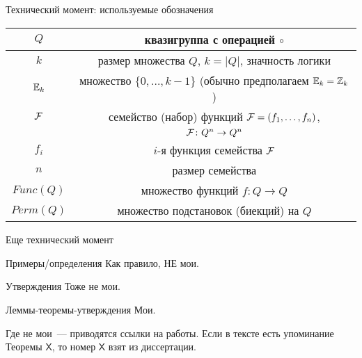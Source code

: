 
\begin{frame}{Технический момент: используемые обозначения}
    \begin{table}
        \begin{center}
            \begin{tabular}{|c|c|}
                \hline
                $Q$ &квазигруппа с операцией $\circ$ \\
                \hline 
                $k$ & размер множества $Q$, $k = \lvert Q \rvert$, значность логики \\
                \hline
                $\mathbb{E}_k$ & множество $\{0, \ldots, k-1 \}$ (обычно предполагаем $\mathbb{E}_k = \mathbb{Z}_k$) \\
                \hline
                $\mathcal{F}$ & семейство (набор) функций $\mathcal{F} = (f_1, \ldots, f_n)$, \\
                      & $\mathcal{F} \colon Q^n \to Q^n$ \\
                \hline 
                $f_i$ & $i$-я функция семейства $\mathcal{F}$ \\
                \hline
                $n$ & размер семейства \\
                \hline
                $Func(Q)$ & множество функций $f \colon Q \to Q$ \\
                \hline 
                $Perm(Q)$ & множество подстановок (биекций) на $Q$ \\
                \hline
            \end{tabular}
        \end{center}
    \end{table}
\end{frame}


\begin{frame}{Еще технический момент}

    \begin{myexample}{Примеры/определения}
        Как правило, НЕ мои.
    \end{myexample}

    \begin{mypropos}{Утверждения}
        Тоже не мои.
    \end{mypropos}

    \begin{mytheorem}{Леммы-теоремы-утверждения}
        Мои.
    \end{mytheorem}

    Где не мои~--- приводятся ссылки на работы.
    Если в тексте есть упоминание Теоремы $\mathsf{X}$, то номер $\mathsf{X}$ взят из диссертации.

\end{frame}


